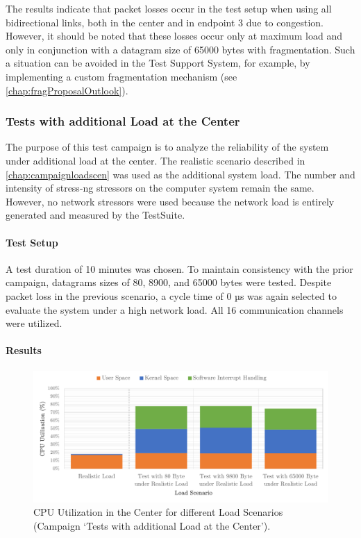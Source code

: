 The results indicate that packet losses occur in the test setup when using all bidirectional links, both in the center and in endpoint 3 due to congestion. However, it should be noted that these losses occur only at maximum load and only in conjunction with a datagram size of 65000 bytes with fragmentation. Such a situation can be avoided in the Test Support System, for example, by implementing a custom fragmentation mechanism (see \ref{chap:fragProposalOutlook}).

\subsubsection{Tests with additional Load at the Center}
The purpose of this test campaign is to analyze the reliability of the system under additional load at the center. The realistic scenario described in \ref{chap:campaignloadscen} was used as the additional system load. The number and intensity of stress-ng stressors on the computer system remain the same. However, no network stressors were used because the network load is entirely generated and measured by the TestSuite.

\paragraph{Test Setup}
A test duration of 10 minutes was chosen. To maintain consistency with the prior campaign, datagrams sizes of 80, 8900, and 65000 bytes were tested. Despite packet loss in the previous scenario, a cycle time of 0 µs was again selected to evaluate the system under a high network load. All 16 communication channels were utilized.

\paragraph{Results}

\begin{figure}[h]
    \centering
    \includegraphics[width=1\linewidth]{figures/reliability/ihawk/diagr7.pdf}
    \caption{CPU Utilization in the Center for different Load Scenarios (Campaign `Tests with additional Load at the Center').}
    \label{fig:diagr7CPU}
\end{figure}


